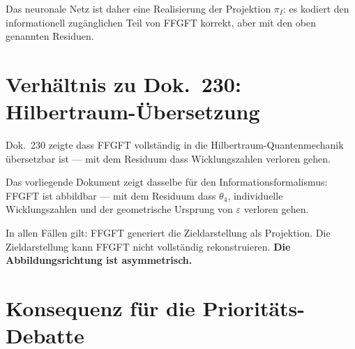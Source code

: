 Das neuronale Netz ist daher eine Realisierung der Projektion $\pi_I$:
es kodiert den informationell zugänglichen Teil von FFGFT korrekt,
aber mit den oben genannten Residuen.

\section{Verhältnis zu Dok.~230: Hilbertraum-Über\-setzung}

Dok.~230 zeigte dass FFGFT vollständig in die Hilbertraum-Quantenmechanik
übersetzbar ist --- mit dem Residuum dass Wicklungszahlen verloren gehen.

Das vorliegende Dokument zeigt dasselbe für den Informationsformalismus:
FFGFT ist abbildbar --- mit dem Residuum dass $\theta_4$, individuelle
Wicklungszahlen und der geometrische Ursprung von $\varepsilon$ verloren gehen.

\begin{center}
\renewcommand{\arraystretch}{1.3}
{\small
{}
}
\end{center}

In allen Fällen gilt: FFGFT generiert die Zieldarstellung als Projektion.
Die Zieldarstellung kann FFGFT nicht vollständig rekonstruieren.
\textbf{Die Abbildungsrichtung ist asymmetrisch.}

\section{Konsequenz für die Prioritäts-Debatte}

